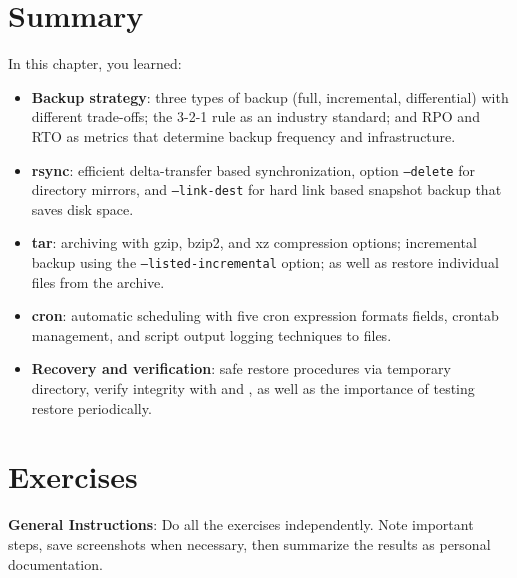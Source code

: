 \section{Summary}
\label{sec:backup-summary}

In this chapter, you learned:

\begin{itemize}[noitemsep,topsep=2pt]
\item \textbf{Backup strategy}: three types of backup (full, incremental,
differential) with different trade-offs; the 3-2-1 rule as an industry standard; and RPO and RTO as metrics that determine backup frequency and infrastructure.
\item \textbf{rsync}: efficient delta-transfer based synchronization, option
\texttt{--delete} for directory mirrors, and \texttt{--link-dest} for
hard link based snapshot backup that saves disk space.
\item \textbf{tar}: archiving with gzip, bzip2, and xz compression options;
incremental backup using the \texttt{--listed-incremental} option; as well as restore individual files from the archive.
\item \textbf{cron}: automatic scheduling with five cron expression formats
fields, crontab management, and script output logging techniques to files.
\item \textbf{Recovery and verification}: safe restore procedures via
temporary directory, verify integrity with  and
, as well as the importance of testing restore periodically.
\end{itemize}

\section{Exercises}
\label{sec:backup-exercises}

\textbf{General Instructions}: Do all the exercises independently. Note important steps, save screenshots when necessary, then summarize the results as personal documentation.

